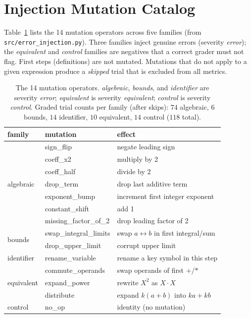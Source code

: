 \section{Injection Mutation Catalog}
\label{app:mutations}

Table~\ref{tab:mutations} lists the 14 mutation operators across five families
(from \texttt{src/error\_injection.py}). Three families inject genuine errors
(severity \emph{error}); the \emph{equivalent} and \emph{control} families are
negatives that a correct grader must not flag. First steps (definitions) are not
mutated. Mutations that do not apply to a given expression produce a
\emph{skipped} trial that is excluded from all metrics.

\begin{table}[tp]
\centering
\small
\begin{tabular}{lll}
\toprule
family & mutation & effect \\
\midrule
\multirow{7}{*}{algebraic}
 & sign\_flip & negate leading sign \\
 & coeff\_x2 & multiply by 2 \\
 & coeff\_half & divide by 2 \\
 & drop\_term & drop last additive term \\
 & exponent\_bump & increment first integer exponent \\
 & constant\_shift & add 1 \\
 & missing\_factor\_of\_2 & drop leading factor of 2 \\
\midrule
\multirow{2}{*}{bounds}
 & swap\_integral\_limits & swap $a\leftrightarrow b$ in first integral/sum \\
 & drop\_upper\_limit & corrupt upper limit \\
\midrule
identifier & rename\_variable & rename a key symbol in this step \\
\midrule
\multirow{3}{*}{equivalent}
 & commute\_operands & swap operands of first $+$/$*$ \\
 & expand\_power & rewrite $X^2$ as $X\cdot X$ \\
 & distribute & expand $k(a{+}b)$ into $ka{+}kb$ \\
\midrule
control & no\_op & identity (no mutation) \\
\bottomrule
\end{tabular}
\caption{The 14 mutation operators. \emph{algebraic}, \emph{bounds}, and
\emph{identifier} are severity \emph{error}; \emph{equivalent} is severity
\emph{equivalent}; \emph{control} is severity \emph{control}. Graded trial
counts per family (after skips): $74$ algebraic, $6$ bounds, $14$ identifier,
$10$ equivalent, $14$ control ($118$ total).}
\label{tab:mutations}
\end{table}

